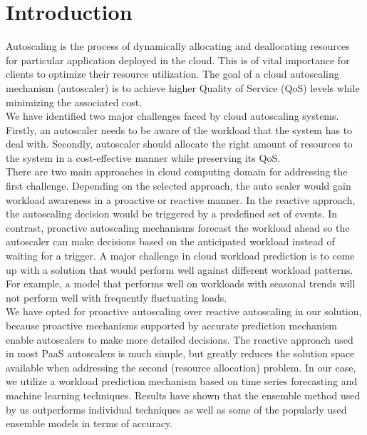 \section{Introduction}
Autoscaling is the process of dynamically allocating and deallocating resources for particular application deployed in the cloud. This is of vital importance for clients to optimize their resource utilization.  The goal of a cloud autoscaling mechanism (autoscaler) is to achieve higher Quality of Service (QoS) levels while minimizing the associated cost. \\

We have identified two major challenges faced by cloud autoscaling systems. Firstly, an autoscaler needs to be aware of the workload that the system has to deal with. Secondly, autoscaler should  allocate the right amount of resources to the system in a cost-effective manner while preserving its QoS.\\

There are two main approaches in cloud computing domain for addressing the first challenge. Depending on the selected approach, the auto scaler would gain workload awareness in a proactive or reactive manner. In the reactive approach, the autoscaling decision would be triggered by a predefined set of events. In contrast, proactive autoscaling mechanisms forecast the workload ahead so the autoscaler can make decisions based on the anticipated workload instead of waiting for a trigger. A major challenge in cloud workload prediction is to come up with a solution that would perform well against different workload patterns. For example, a model that performs well on workloads with seasonal trends will not perform well with frequently fluctuating loads.\\

We have opted for proactive autoscaling over reactive autoscaling in our solution, because proactive mechanisms supported by accurate prediction mechanism enable autoscalers to make more detailed decisions. The reactive approach used in most PaaS autoscalers is much simple, but greatly reduces the solution space available when addressing the second (resource allocation) problem. In our case, we utilize a workload prediction mechanism based on time series forecasting and machine learning techniques. Results have shown that the ensemble method used by us outperforms individual techniques as well as some of the popularly used ensemble models in terms of accuracy.\\

